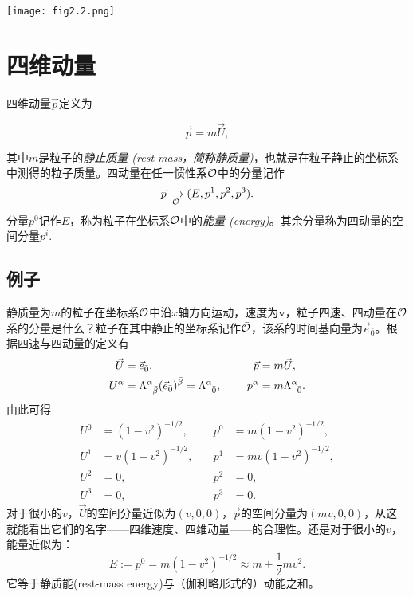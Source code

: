 {
    \centering
    \texttt{[image: fig2.2.png]}
    \label{fig2.2}
}


\section{四维动量}
\label{sec2.4}
四维动量$\vec{p}$定义为
\begin{shaded}
\begin{equation}
    \vec{p} = m \vec{U},
\label{equ2.19}
\end{equation}
\end{shaded}
其中$m$是粒子的\textit{静止质量 (rest mass，简称静质量)}，也就是在粒子静止的坐标系中测得的粒子质量。四动量在任一惯性系$\mathcal{O}$中的分量记作
\begin{equation}
    \vec{p} \xrightarrow[\mathcal{O}]{ } (E, p^1, p^2, p^3).
\label{equ2.20}
\end{equation}
分量$p^0$记作$E$，称为粒子在坐标系$\mathcal{O}$中的\textit{能量 (energy)}。其余分量称为四动量的空间分量$p^i$.

\subsection*{例子}
静质量为$m$的粒子在坐标系$\mathcal{O}$中沿$x$轴方向运动，速度为$\bm{v}$，粒子四速、四动量在$\mathcal{O}$系的分量是什么？粒子在其中静止的坐标系记作$\bar{\mathcal{O}}$，该系的时间基向量为$\vec{e}_{\bar{0}}$。根据四速与四动量的定义有
\begin{equation}
\begin{split}
    \vec{U} &= \vec{e}_{\bar{0}}, & \quad \vec{p} &= m\vec{U}, \\
    U^\alpha &= \Lambda\indices{^\alpha_{\bar{\beta}}} ( \vec{e}_{\bar{0}} )^{\bar{\beta}} = \Lambda\indices{^\alpha_{\bar{0}}}, \quad & p^\alpha &= m \Lambda\indices{^\alpha_{\bar{0}}}.
\end{split}
\label{equ2.21}
\end{equation}
由此可得
\begin{align*}
    U^0 &= (1 - v^2)^{-1/2}, \quad & p^0 &= m(1 - v^2)^{-1/2}, \\
    U^1 &= v (1 - v^2)^{-1/2}, \quad & p^1 &= mv (1 - v^2)^{-1/2}, \\
    U^2 &= 0, \quad & p^2 &= 0, \\
    U^3 &= 0, \quad & p^3 &= 0.
\end{align*}
对于很小的$v$，$\vec{U}$的空间分量近似为$(v, 0, 0)$，$\vec{p}$的空间分量为$(mv, 0, 0)$，从这就能看出它们的名字——四维速度、四维动量——的合理性。还是对于很小的$v$，能量近似为：
\begin{equation*}
    E := p^0 = m (1 - v^2)^{-1/2} \approx m + \frac{1}{2} m v^2.
\end{equation*}
它等于静质能(rest-mass energy)与（伽利略形式的）动能之和。

